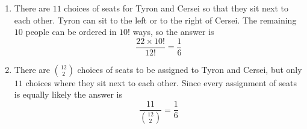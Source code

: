 \begin{enumerate}[label=(\alph*)]
\item  There are $11$ choices of seats for Tyron and Cersei so that they sit 
next to each other. Tyron can sit to the left or to the right of Cersei. 
The remaining $10$ people can be ordered in $10!$ ways, so the answer is
$$\frac{22\times10!}{12!} = \frac{1}{6}$$

\item There are $\binom{12}{2}$ choices of seats to be assigned to Tyron and 
Cersei, but only $11$ choices where they sit next to each other. 
Since every assignment of seats is equally likely the answer is
$$\frac{11}{\binom{12}{2}} = \frac{1}{6}$$

\end{enumerate}